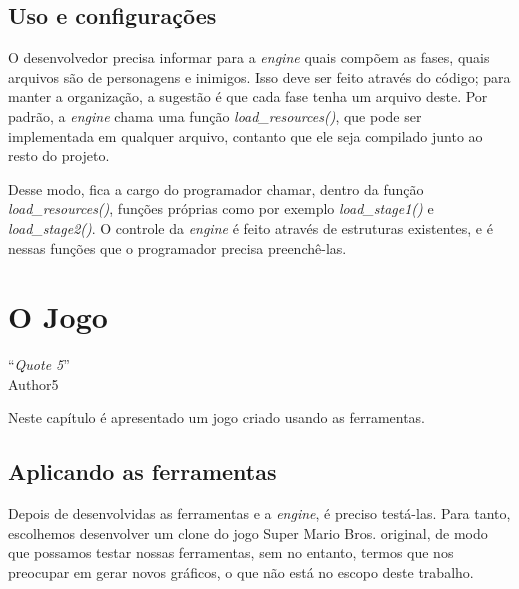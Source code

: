\documentclass[brazil]{abnt}
\begin{document}
\section{Uso e configurações}

O desenvolvedor precisa informar para a \textit{engine} quais compõem as fases, quais arquivos são de personagens e inimigos. Isso deve ser feito através do código; para manter a organização, a sugestão é que cada fase tenha um arquivo deste. Por padrão, a \textit{engine} chama uma função \textit{load\_resources()}, que pode ser implementada em qualquer arquivo, contanto que ele seja compilado junto ao resto do projeto.

Desse modo, fica a cargo do programador chamar, dentro da função \textit{load\_resources()}, funções próprias como por exemplo \textit{load\_stage1()} e \textit{load\_stage2()}. O controle da \textit{engine} é feito através de estruturas existentes, e é nessas funções que o programador precisa preenchê-las.




\chapter{O Jogo}

\vfill{}
\begin{flushright}{}``\emph{Quote 5}''\\
{\small Author5}\end{flushright}{\small \par}
\vfill{}

Neste capítulo é apresentado um jogo criado usando as ferramentas.
\newpage

\section{Aplicando as ferramentas}

Depois de desenvolvidas as ferramentas e a \textit{engine}, é preciso testá-las. Para tanto, escolhemos desenvolver um clone do jogo Super Mario Bros. original, de modo que possamos testar nossas ferramentas, sem no entanto, termos que nos preocupar em gerar novos gráficos, o que não está no escopo deste trabalho.
\end{document}
